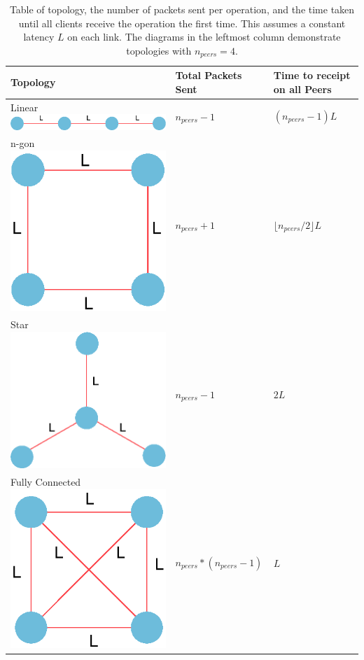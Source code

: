 \documentclass[12pt,a4paper,twoside,openright]{report}
\begin{document}
			\begin{table}[htb]
			\centering
			\caption[Number of Packets in P2P Network] {Table of topology, the number of packets sent per operation, and the time taken until all clients receive the operation the first time. This assumes a constant latency $L$ on each link. The diagrams in the leftmost column demonstrate topologies with $n_{peers}=4$.}
			\label{tab:topologypackets}
			\setlength{\tabcolsep}{12pt}
			\begin{tabular}{@{}lll@{}}
			Topology		& Total Packets Sent            & Time to receipt on all Peers   \\ \toprule
			\makecell{Linear \\ \includegraphics[width=0.2\linewidth]{figs/linear_top.eps}  }        & $n_{peers} - 1$                   & $(n_{peers}-1)L$              \\ \midrule
			\makecell{n-gon  \\ \includegraphics[width=0.2\linewidth]{figs/ngon_top.eps} }        & $n_{peers}+1$                 & $\lfloor n_{peers}/2 \rfloor L$ \\ \midrule
			\makecell{Star  \\ \includegraphics[width=0.2\linewidth]{figs/star.eps} }         & $n_{peers} - 1$ 	                & $2L$                           \\ \midrule
			\makecell{Fully Connected  \\ \includegraphics[width=0.2\linewidth]{figs/fullyconnected.eps} } & $n_{peers} * (n_{peers} - 1)$ & $L$                 \\ \bottomrule          
			\end{tabular}
			\end{table}
			
\end{document}
